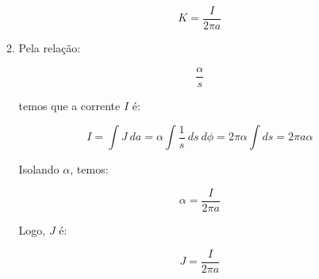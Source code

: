 \documentclass[11pt,a4paper]{article}
\begin{document}
\begin{enumerate}
\begin{enumerate}
$$K = \displaystyle\dfrac{I}{2\pi a}$$

\item

Pela relação:

$$\displaystyle\dfrac{\alpha}{s}$$

temos que a corrente $I$ é:

$$I = \displaystyle\int J \ da = \alpha \displaystyle\int \displaystyle\dfrac{1}{s} \ ds \ d\phi = 2\pi \alpha \displaystyle\int ds = 2 \pi a \alpha$$

Isolando $\alpha$, temos:

$$\alpha = \displaystyle\dfrac{I}{2\pi a}$$

Logo, $J$ é:

$$J = \displaystyle\dfrac{I}{2\pi a}$$

\end{enumerate}


\end{enumerate}
	
\end{document}
